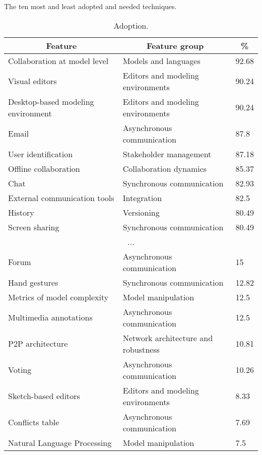 
  \begin{table*}[]
  \caption{The ten most and least adopted and needed techniques.}
  \label{tab:top-bottom-need}
  \begin{subtable}[c]{0.5\textwidth}
  \centering
  \notsotiny
  \caption{Adoption.}
  \label{tab:top-bottom-current}
  \begin{tabular}{@{}lll@{}}
  \toprule
  \multicolumn{1}{c}{\textbf{Feature}} & \multicolumn{1}{c}{\textbf{Feature group}} & \multicolumn{1}{c}{\textbf{\%}} \\
  \midrule
  Collaboration at model level & Models and languages & 92.68 \\ 
Visual editors & Editors and modeling environments & 90.24 \\ 
Desktop-based modeling environment & Editors and modeling environments & 90.24 \\ 
Email & Asynchronous communication & 87.8 \\ 
User identification & Stakeholder management & 87.18 \\ 
Offline collaboration & Collaboration dynamics & 85.37 \\ 
Chat & Synchronous communication & 82.93 \\ 
External communication tools & Integration & 82.5 \\ 
History & Versioning & 80.49 \\ 
Screen sharing & Synchronous communication & 80.49 \\ 
\multicolumn{3}{c}{...} \\ 
Forum & Asynchronous communication & 15 \\ 
Hand gestures & Synchronous communication & 12.82 \\ 
Metrics of model complexity & Model manipulation & 12.5 \\ 
Multimedia annotations & Asynchronous communication & 12.5 \\ 
P2P architecture & Network architecture and robustness & 10.81 \\ 
Voting & Asynchronous communication & 10.26 \\ 
Sketch-based editors & Editors and modeling environments & 8.33 \\ 
Conflicts table & Asynchronous communication & 7.69 \\ 
Natural Language Processing & Model manipulation & 7.5 \\ 

\end{tabular}
\end{subtable}
\end{table*}
